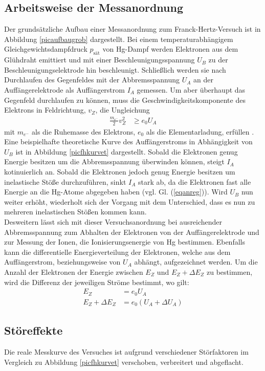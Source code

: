 \subsection{Arbeitsweise der Messanordnung}
 
Der grundsätzliche Aufbau einer Messanordnung zum Franck-Hertz-Versuch ist in Abbildung \ref{picaufbaugrob}
dargestellt. Bei einem temperaturabhängigem Gleichgewichtsdampfdruck $p_{\text{sät}}$ von Hg-Dampf 
werden Elektronen aus dem Glühdraht emittiert und mit einer Beschleunigungsspannung $U_B$ zu der
Beschleunigungselektrode hin beschleunigt. Schließlich werden sie nach Durchlaufen des 
Gegenfeldes mit der Abbremsspannung $U_A$ an der Auffängerelektrode als Auffängerstrom $I_A$
gemessen. Um aber überhaupt das Gegenfeld durchlaufen zu können, muss die Geschwindigkeitskomponente
des Elektrons in Feldrichtung, $v_Z$, die Ungleichung
\begin{align}
\frac{m_{e^-}}{2} v_Z^2 &\geq e_0 U_A 
\end{align}
mit $m_{e^-}$ als die Ruhemasse des Elektrons, $e_0$ als die Elementarladung, erfüllen \cite{anleitung}.\\
Eine beispielhafte theoretische Kurve des Auffängerstroms in Abhängigkeit von $U_B$ ist in
Abbildung \ref{picfhkurvet} dargestellt. Sobald die Elektronen genug Energie besitzen um die 
Abbremsspannung überwinden können, steigt $I_A$ kotinuierlich an. Sobald die Elektronen jedoch
genug Energie besitzen um inelastische Stöße durchzuführen, sinkt $I_A$ stark ab, da die Elektronen
fast alle Energie an die Hg-Atome abgegeben haben (vgl. Gl. (\ref{eqanreg})). Wird $U_B$ nun weiter
erhöht, wiederholt sich der Vorgang mit dem Unterschied, dass es nun zu mehreren inelastischen Stößen 
kommen kann. \\
Desweitern lässt sich mit dieser Versuchsanordnung bei ausreichender Abbremsspannung zum Abhalten
der Elektronen von der Auffängerelektrode und zur Messung der Ionen, die 
Ionisierungsenergie von Hg bestimmen. Ebenfalls kann die differentielle Energieverteilung der Elektronen,
welche aus dem Auffängerstrom, beziehungsweise von $U_A$ abhängt, aufgezeichnet werden.
Um die Anzahl der Elektronen der Energie zwischen $E_Z$ und $E_Z + \Delta E_Z$ zu bestimmen, wird
die Differenz der jeweiligen Ströme bestimmt, wo gilt:
\begin{align}
E_Z&=e_0 U_A \\
E_Z + \Delta E_Z &= e_0 (U_A + \Delta U_A)
\end{align}
\subsection{Störeffekte}
 Die reale Messkurve des Versuches ist aufgrund verschiedener Störfaktoren im Vergleich zu Abbildung
 \ref{picfhkurvet} verschoben, verbreitert und abgeflacht. \\
 
